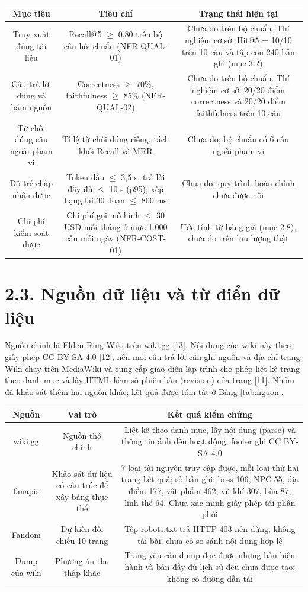 \begin{longtable*}{|C{0.30}|C{0.31}|C{0.39}|}
\hline \textbf{Mục tiêu} & \textbf{Tiêu chí} & \textbf{Trạng thái hiện tại} \\ \hline
Truy xuất đúng tài liệu & Recall@5 $\geq$ 0,80 trên bộ câu hỏi chuẩn (NFR-QUAL-01) & Chưa đo trên bộ chuẩn. Thí nghiệm cơ sở: Hit@5 = 10/10 trên 10 câu và tập con 240 bản ghi (mục 3.2) \\ \hline
Câu trả lời đúng và bám nguồn & Correctness $\geq$ 70\%, faithfulness $\geq$ 85\% (NFR-QUAL-02) & Chưa đo trên bộ chuẩn. Thí nghiệm cơ sở: 20/20 điểm correctness và 20/20 điểm faithfulness trên 10 câu \\ \hline
Từ chối đúng câu ngoài phạm vi & Tỉ lệ từ chối đúng riêng, tách khỏi Recall và MRR & Chưa đo; bộ chuẩn có 6 câu ngoài phạm vi \\ \hline
Độ trễ chấp nhận được & Token đầu $\leq$ 3,5 s, trả lời đầy đủ $\leq$ 10 s (p95); xếp hạng lại 30 đoạn $\leq$ 800 ms & Chưa đo; quy trình hoàn chỉnh chưa được nối \\ \hline
Chi phí kiểm soát được & Chi phí gọi mô hình $\leq$ 30 USD mỗi tháng ở mức 1.000 câu mỗi ngày (NFR-COST-01) & Ước tính từ bảng giá (mục 2.8), chưa đo trên lưu lượng thật \\ \hline
\end{longtable*}
\tabend


\section{2.3. Nguồn dữ liệu và từ điển dữ liệu}

Nguồn chính là Elden Ring Wiki trên wiki.gg [13]. Nội dung của wiki này theo giấy phép CC BY-SA 4.0 [12], nên mọi câu trả lời cần ghi nguồn và địa chỉ trang. Wiki chạy trên MediaWiki và cung cấp giao diện lập trình cho phép liệt kê trang theo danh mục và lấy HTML kèm số phiên bản (revision) của trang [11]. Nhóm đã khảo sát thêm hai nguồn khác; kết quả được tóm tắt ở Bảng \ref{tab:nguon}.


\begin{longtable*}{|C{0.17}|C{0.25}|C{0.58}|}
\hline \textbf{Nguồn} & \textbf{Vai trò} & \textbf{Kết quả kiểm chứng} \\ \hline
wiki.gg & Nguồn thô chính & Liệt kê theo danh mục, lấy nội dung (parse) và thông tin ảnh đều hoạt động; footer ghi CC BY-SA 4.0 \\ \hline
fanapis & Khảo sát dữ liệu có cấu trúc để xây bảng thực thể & 7 loại tài nguyên truy cập được, mỗi loại thử hai trang kết quả; số bản ghi: boss 106, NPC 55, địa điểm 177, vật phẩm 462, vũ khí 307, bùa 87, linh thể 64. Chưa xác minh giấy phép tái phân phối \\ \hline
Fandom & Dự kiến đối chiếu 10 trang & Tệp robots.txt trả HTTP 403 nên dừng, không tải bài; chưa có so sánh nội dung hợp lệ \\ \hline
Dump của wiki & Phương án thu thập khác & Trang yêu cầu dump đọc được nhưng bản hiện hành và bản đầy đủ lịch sử đều chưa được tạo; không có đường dẫn tải \\ \hline
\end{longtable*}
\tabend


